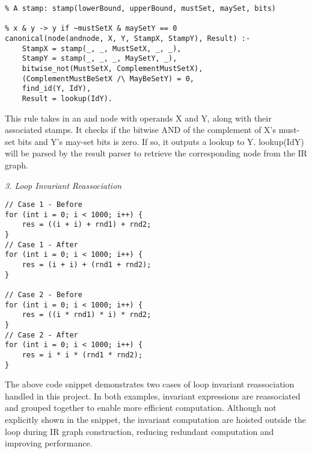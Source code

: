 \begin{lstlisting}
% A stamp: stamp(lowerBound, upperBound, mustSet, maySet, bits)

% x & y -> y if ~mustSetX & maySetY == 0
canonical(node(andnode, X, Y, StampX, StampY), Result) :-
    StampX = stamp(_, _, MustSetX, _, _),
    StampY = stamp(_, _, _, MaySetY, _),
    bitwise_not(MustSetX, ComplementMustSetX),
    (ComplementMustBeSetX /\ MayBeSetY) = 0,
    find_id(Y, IdY),
    Result = lookup(IdY).
\end{lstlisting}

This rule takes in an and node with operands X and Y, along with their associated stamps. It checks if the bitwise AND of the complement of X's must-set bits and Y's may-set bits is zero. If so, it outputs a lookup to Y. lookup(IdY) will be parsed by the result parser to retrieve the corresponding node from the IR graph.

\bigbreak
\textit{3. Loop Invariant Reassociation}
\begin{lstlisting}
// Case 1 - Before
for (int i = 0; i < 1000; i++) {
    res = ((i + i) + rnd1) + rnd2;
}
// Case 1 - After
for (int i = 0; i < 1000; i++) {
    res = (i + i) + (rnd1 + rnd2);
}

// Case 2 - Before
for (int i = 0; i < 1000; i++) {
    res = ((i * rnd1) * i) * rnd2;
}
// Case 2 - After
for (int i = 0; i < 1000; i++) {
    res = i * i * (rnd1 * rnd2);
}
\end{lstlisting}

The above code snippet demonstrates two cases of loop invariant reassociation handled in this project. 
In both examples, invariant expressions are reassociated and grouped together to enable more efficient computation.
Although not explicitly shown in the snippet, the invariant computation are hoisted outside the loop during IR graph construction, reducing redundant computation and improving performance.

